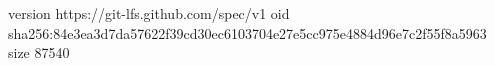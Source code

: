 version https://git-lfs.github.com/spec/v1
oid sha256:84e3ea3d7da57622f39cd30ec6103704e27e5cc975e4884d96e7c2f55f8a5963
size 87540
